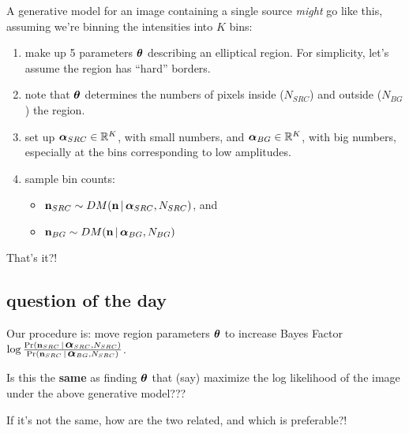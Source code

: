 \documentclass[12pt]{article}
\newcommand{\given}{\,|\,}
\renewcommand{\vec}[1]{\mathbf{#1}}
\newcommand{\balpha}{\mbox{\boldmath $\alpha$}}
\newcommand{\btheta}{\mbox{\boldmath $\theta$}}
\begin{document}
A generative model for an image containing a single source {\it might}
go like this, assuming we're binning the intensities into $K$ bins:
\begin{enumerate}
\item make up 5 parameters $\btheta$ describing an elliptical region. For simplicity, let's assume the region has ``hard'' borders.
\item note that $\btheta$ determines the numbers of pixels inside ($N_{SRC}$)  and  outside ($N_{BG}$) the region.
\item set up $\balpha_{SRC} \in \mathbb{R}^K$, with small numbers,
  and $\balpha_{BG} \in \mathbb{R}^K$, with big numbers, especially at the bins corresponding to low amplitudes.
\item sample bin counts:
  \begin{itemize}
    \item    $\vec{n}_{SRC} \sim DM(\vec{n} \given \balpha_{SRC}, N_{SRC})$, and 
    \item $\vec{n}_{BG} \sim DM(\vec{n} \given \balpha_{BG}, N_{BG})$
  \end{itemize}
\end{enumerate}
That's it?!

\subsection{question of the day}
Our procedure is: move region parameters $\btheta$ to increase Bayes Factor $\log \frac{\Pr(\vec{n}_{SRC} \given \balpha_{SRC}, N_{SRC})}{\Pr(\vec{n}_{SRC} \given \balpha_{BG}, N_{SRC})}
{}$.

Is this the {\bf same} as finding $\btheta$ that (say) maximize the log
likelihood of the image under the above generative model???

If it's not the same, how are the two related, and which is preferable?!
\end{document}
